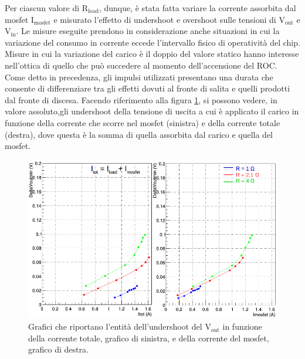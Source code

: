 Per ciascun valore di $\mathrm{R_{load}}$, dunque, è stata fatta variare la corrente assorbita dal mosfet $\mathrm{I_{mosfet}}$ e misurato l'effetto di undershoot e overshoot sulle tensioni di $\mathrm{V_{out}}$ e $\mathrm{V_{in}}$. 
Le misure eseguite prendono in considerazione anche situazioni in cui la variazione del consumo in corrente eccede l'intervallo fisico di operatività del chip. Misure in cui la variazione del carico è il doppio del valore statico hanno interesse nell'ottica di quello che può succedere al momento dell'accensione del ROC.%
Come detto in precedenza, gli impulsi utilizzati presentano una durata che consente di differenziare tra gli effetti dovuti al fronte di salita e quelli prodotti dal fronte di discesa. 
Facendo riferimento alla figura \ref{VoutUnd}, si possono vedere, in valore assoluto,gli undershoot della tensione di uscita a cui è applicato il carico in funzione della corrente che scorre nel mosfet (sinistra) e della corrente totale (destra), dove questa è la somma di quella assorbita dal carico e quella del mosfet. 
\begin{figure}
\centering
\includegraphics[width=0.9\linewidth]{Immagini/VoutUnd}
\caption{Grafici che riportano l'entità dell'undershoot del $\mathrm{V_{out}}$ in funzione della corrente totale, grafico di sinistra, e della corrente del mosfet, grafico di destra.}
\label{VoutUnd}
\end{figure}
